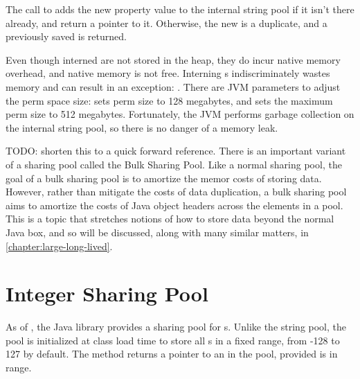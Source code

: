 The call to  adds the new property value 
 to the internal string
pool if it isn't there already, and return a pointer to it. Otherwise, the
new  is a duplicate, and a previously saved  is
returned.

Even though interned  are not stored in the heap, they do incur
native memory overhead, and native memory is not free.
 Interning s indiscriminately wastes memory and can result in an
 exception: . 
There are JVM parameters to adjust the perm space size:
 sets perm size to 128 megabytes, and
 sets the maximum perm size to 512 megabytes.
Fortunately, the JVM performs garbage collection on the internal string pool, so there is no danger of a memory leak.

TODO: shorten this to a quick forward reference. There is an
important variant of a sharing pool called the Bulk Sharing Pool. Like a normal sharing pool, the goal of a bulk sharing pool is to amortize the
memor costs of storing data. However, rather than mitigate the costs of data
duplication, a bulk sharing pool aims to amortize the costs of Java object
headers across the elements in a pool. This is a topic that stretches notions of
how to store data beyond the normal Java box, and so will be discussed, along
with many similar matters, in \autoref{chapter:large-long-lived}.

\section{Integer Sharing Pool}

As of \javafive, the Java library provides a sharing pool for s.
Unlike the string pool, the  pool is initialized at class load
time to store all s in a fixed range, from -128 to 127 by
default. The method  returns a pointer to an
 in the pool, provided  is in range.

